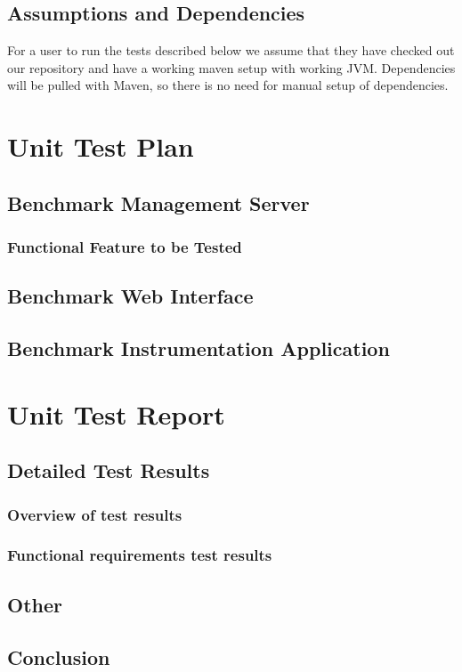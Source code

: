 \documentclass[11pt,a4paper]{article}
\begin{document}
\subsection{Assumptions and Dependencies}
For a user to run the tests described below we assume that they have checked out our
repository and have a working maven setup with working JVM. Dependencies will be 
pulled with Maven, so there is no need for manual setup of dependencies.

\section{Unit Test Plan}
\subsection{Benchmark Management Server}
\subsubsection{Functional Feature to be Tested}


\subsection{Benchmark Web Interface}


\subsection{Benchmark Instrumentation Application}


\section{Unit Test Report}
\subsection{Detailed Test Results}\label{Results}
\subsubsection{Overview of test results}
\subsubsection{Functional requirements test results}
\subsection{Other}\label{other}
\subsection{Conclusion}\label{conclusion}
\end{document}
